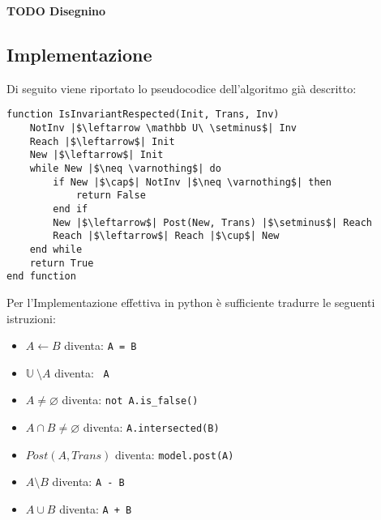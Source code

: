 \documentclass[12pt]{article}
\begin{document}
    \textbf{TODO Disegnino}

    \subsection{Implementazione}
    Di seguito viene riportato lo pseudocodice dell'algoritmo già descritto:

    \begin{verbatim}
function IsInvariantRespected(Init, Trans, Inv)
    NotInv |$\leftarrow \mathbb U\ \setminus$| Inv
    Reach |$\leftarrow$| Init
    New |$\leftarrow$| Init
    while New |$\neq \varnothing$| do
        if New |$\cap$| NotInv |$\neq \varnothing$| then
            return False
        end if
        New |$\leftarrow$| Post(New, Trans) |$\setminus$| Reach
        Reach |$\leftarrow$| Reach |$\cup$| New
    end while
    return True
end function
    \end{verbatim}

    Per l'Implementazione effettiva in python è sufficiente tradurre le seguenti istruzioni:
    \begin{itemize}
        \item $A \leftarrow B$ diventa: \texttt{A = B}
        \item $\mathbb U\ \setminus A$ diventa: \texttt{~A}
        \item $A \neq \varnothing$ diventa: \texttt{not A.is_false()}
        \item $A \cap B \neq \varnothing$ diventa: \texttt{A.intersected(B)}
        \item $Post(A, Trans)$ diventa: \texttt{model.post(A)}
        \item $A \setminus B$ diventa: \texttt{A - B}
        \item $A \cup B$ diventa: \texttt{A + B}
    \end{itemize}


    
\end{document}
